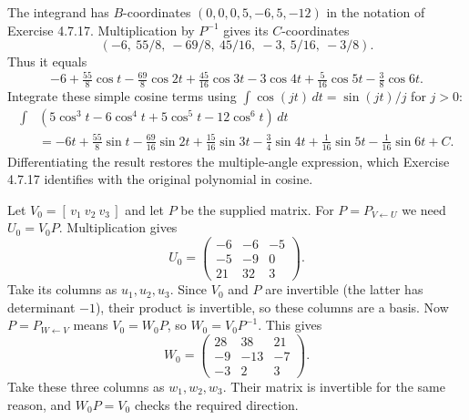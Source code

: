The integrand has $B$-coordinates $(0,0,0,5,-6,5,-12)$ in the notation
of Exercise 4.7.17. Multiplication by $P^{-1}$ gives its $C$-coordinates
\[
 (-6,\ 55/8,\ -69/8,\ 45/16,\ -3,\ 5/16,\ -3/8).
\]
Thus it equals
\[
 -6+\tfrac{55}8\cos t-\tfrac{69}8\cos2t+\tfrac{45}{16}\cos3t
 -3\cos4t+\tfrac5{16}\cos5t-\tfrac38\cos6t.
\]
Integrate these simple cosine terms using
$\int\cos(jt)\,dt=\sin(jt)/j$ for $j>0$:
\begin{align*}
 \int &(5\cos^3t-6\cos^4t+5\cos^5t-12\cos^6t)\,dt\\
 &=-6t+\tfrac{55}8\sin t-\tfrac{69}{16}\sin2t+\tfrac{15}{16}\sin3t
 -\tfrac34\sin4t+\tfrac1{16}\sin5t-\tfrac1{16}\sin6t+C.
\end{align*}
Differentiating the result restores the multiple-angle expression, which
Exercise 4.7.17 identifies with the original polynomial in cosine.

Let $V_0=[\,v_1\ v_2\ v_3\,]$ and let $P$ be the supplied matrix.
For $P=P_{V\leftarrow U}$ we need $U_0=V_0P$. Multiplication gives
\[ U_0=\begin{pmatrix}-6&-6&-5\\-5&-9&0\\21&32&3\end{pmatrix}.\]
Take its columns as $u_1,u_2,u_3$. Since $V_0$ and $P$ are invertible (the latter has determinant $-1$), their product is invertible, so these columns are a basis.
Now $P=P_{W\leftarrow V}$ means $V_0=W_0P$, so $W_0=V_0P^{-1}$. This gives
\[ W_0=\begin{pmatrix}28&38&21\\-9&-13&-7\\-3&2&3\end{pmatrix}.\]
Take these three columns as $w_1,w_2,w_3$. Their matrix is invertible for the same reason, and $W_0P=V_0$ checks the required direction.

